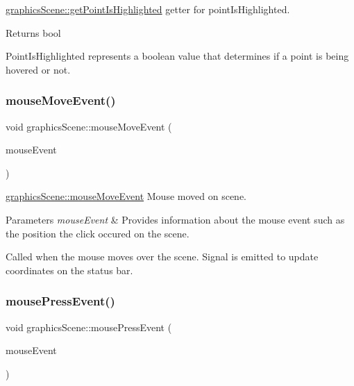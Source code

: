 \mbox{\hyperlink{classgraphics_scene_ab84d166160c74279bae4f59c2ccac244}{graphics\+Scene\+::get\+Point\+Is\+Highlighted}} getter for point\+Is\+Highlighted. 

\begin{DoxyReturn}{Returns}
bool
\end{DoxyReturn}
Point\+Is\+Highlighted represents a boolean value that determines if a point is being hovered or not. \mbox{\label{classgraphics_scene_a08bfd268527873e3bccaa52f34823058}} 
\subsubsection{\texorpdfstring{mouse\+Move\+Event()}{mouseMoveEvent()}}
{\footnotesize\ttfamily void graphics\+Scene\+::mouse\+Move\+Event (\begin{DoxyParamCaption}\item[{Q\+Graphics\+Scene\+Mouse\+Event $\ast$}]{mouse\+Event }\end{DoxyParamCaption})\hspace{0.3cm}{\ttfamily [virtual]}}



\mbox{\hyperlink{classgraphics_scene_a08bfd268527873e3bccaa52f34823058}{graphics\+Scene\+::mouse\+Move\+Event}} Mouse moved on scene. 


\begin{DoxyParams}{Parameters}
{\em mouse\+Event} & Provides information about the mouse event such as the position the click occured on the scene.\\
\hline
\end{DoxyParams}
Called when the mouse moves over the scene. Signal is emitted to update coordinates on the status bar. \mbox{\label{classgraphics_scene_a45ca641319ec6accb1574f52539e7517}} 
\subsubsection{\texorpdfstring{mouse\+Press\+Event()}{mousePressEvent()}}
{\footnotesize\ttfamily void graphics\+Scene\+::mouse\+Press\+Event (\begin{DoxyParamCaption}\item[{Q\+Graphics\+Scene\+Mouse\+Event $\ast$}]{mouse\+Event }\end{DoxyParamCaption})\hspace{0.3cm}{\ttfamily [virtual]}}



